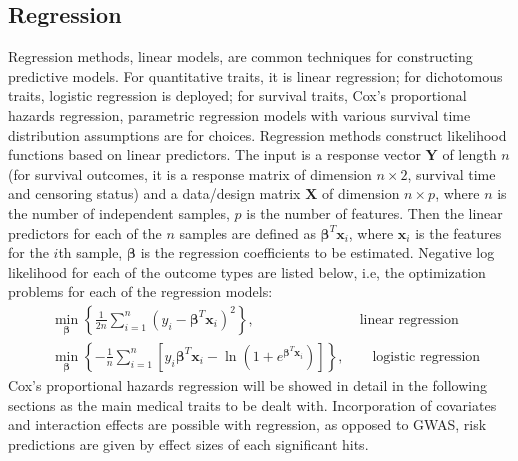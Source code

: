 \subsection{Regression}
Regression methods, linear models, are common techniques for constructing predictive models. For quantitative traits, it is linear regression; for dichotomous traits, logistic regression is deployed; for survival traits, Cox's proportional hazards regression, parametric regression models with various survival time distribution assumptions are for choices. Regression methods construct likelihood functions based on linear predictors. The input is a response vector $\bm{Y}$ of length $n$ (for survival outcomes, it is a response matrix of dimension $n \times 2$, survival time and censoring status) and a data/design matrix $\bm{X}$ of dimension $n \times p$, where $n$ is the number of independent samples, $p$ is the number of features. Then the linear predictors for each of the $n$ samples are defined as $\bm{\beta}^T\bm{x}_i$, where $\bm{x}_i$ is the features for the $i$th sample, $\bm{\beta}$ is the regression coefficients to be estimated. Negative log likelihood for each of the outcome types are listed below, i.e, the optimization problems for each of the regression models:
\begin{align}
    &\min_{\bm{\beta}} \left\{\frac{1}{2n} \sum_{i=1}^{n} (y_i-\bm{\beta}^T\bm{x}_i)^2 \right\}, \qquad\qquad\qquad\quad\;\: \text{linear regression} \label{eq1.1} \\
    &\min_{\bm{\beta}} \left\{-\frac{1}{n} \sum_{i=1}^{n} \left[y_i\bm{\beta}^T\bm{x}_i-\ln(1+e^{\bm{\beta}^T\bm{x}_i})\right]\right\}, \qquad \text{logistic regression} \label{eq1.2}
\end{align}
Cox's proportional hazards regression will be showed in detail in the following sections as the main medical traits to be dealt with. Incorporation of covariates and interaction effects are possible with regression, as opposed to GWAS, risk predictions are given by effect sizes of each significant hits.

